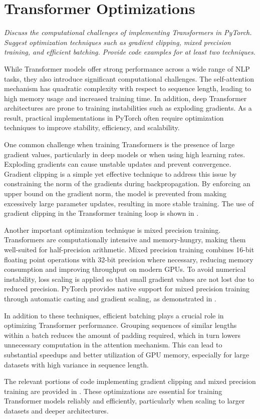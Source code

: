 \section{Transformer Optimizations}
\textit{Discuss the computational challenges of implementing Transformers in PyTorch. Suggest
optimization techniques such as gradient clipping, mixed precision training, and efficient
batching. Provide code examples for at least two techniques.}

While Transformer models offer strong performance across a
wide range of NLP tasks, they also introduce significant
computational challenges.
The self-attention mechanism has quadratic complexity with
respect to sequence length, leading to high memory usage
and increased training time.
In addition, deep Transformer architectures are prone to
training instabilities such as exploding gradients.
As a result, practical implementations in PyTorch often
require optimization techniques to improve stability,
efficiency, and scalability.

One common challenge when training Transformers is the
presence of large gradient values, particularly in deep
models or when using high learning rates.
Exploding gradients can cause unstable updates and prevent
convergence.
Gradient clipping is a simple yet effective technique to
address this issue by constraining the norm of the gradients
during backpropagation.
By enforcing an upper bound on the gradient norm, the model
is prevented from making excessively large parameter updates,
resulting in more stable training.
The use of gradient clipping in the Transformer training
loop is shown in .

Another important optimization technique is mixed precision
training.
Transformers are computationally intensive and memory-hungry,
making them well-suited for half-precision arithmetic.
Mixed precision training combines 16-bit floating point
operations with 32-bit precision where necessary, reducing
memory consumption and improving throughput on modern GPUs.
To avoid numerical instability, loss scaling is applied so
that small gradient values are not lost due to reduced
precision.
PyTorch provides native support for mixed precision training
through automatic casting and gradient scaling, as
demonstrated in .

In addition to these techniques, efficient batching plays a
crucial role in optimizing Transformer performance.
Grouping sequences of similar lengths within a batch reduces
the amount of padding required, which in turn lowers
unnecessary computation in the attention mechanism.
This can lead to substantial speedups and better utilization
of GPU memory, especially for large datasets with high
variance in sequence length.

The relevant portions of code implementing gradient clipping
and mixed precision training are provided in
.
These optimizations are essential for training Transformer
models reliably and efficiently, particularly when scaling
to larger datasets and deeper architectures.

